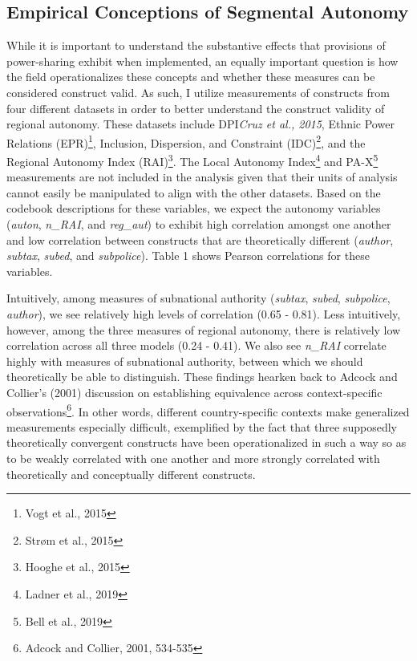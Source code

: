 \documentclass[12pt]{article}
\begin{document}
\subsection{Empirical Conceptions of Segmental Autonomy}
While it is important to understand the substantive effects that provisions of power-sharing exhibit when implemented, an equally important question is how the field operationalizes these concepts and whether these measures can be considered construct valid. As such, I utilize measurements of constructs from four different datasets in order to better understand the construct validity of regional autonomy. These datasets include DPI\textit{Cruz et al., 2015}, Ethnic Power Relations (EPR)\footnote{Vogt et al., 2015}, Inclusion, Dispersion, and Constraint (IDC)\footnote{Strøm et al., 2015}, and the Regional Autonomy Index (RAI)\footnote{Hooghe et al., 2015}. The Local Autonomy Index\footnote{Ladner et al., 2019} and PA-X\footnote{Bell et al., 2019} measurements are not included in the analysis given that their units of analysis cannot easily be manipulated to align with the other datasets. Based on the codebook descriptions for these variables, we expect the autonomy variables (\textit{auton}, \textit{n\_RAI}, and \textit{reg\_aut}) to exhibit high correlation amongst one another and low correlation between constructs that are theoretically different (\textit{author}, \textit{subtax}, \textit{subed}, and \textit{subpolice}). Table 1 shows Pearson correlations for these variables.

Intuitively, among measures of subnational authority (\textit{subtax}, \textit{subed}, \textit{subpolice}, \textit{author}), we see relatively high levels of correlation (0.65 - 0.81). Less intuitively, however, among the three measures of regional autonomy, there is relatively low correlation across all three models (0.24 - 0.41). We also see \textit{n\_RAI} correlate highly with measures of subnational authority, between which we should theoretically be able to distinguish. These findings hearken back to Adcock and Collier's (2001) discussion on establishing equivalence across context-specific observations\footnote{Adcock and Collier, 2001, 534-535}. In other words, different country-specific contexts make generalized measurements especially difficult, exemplified by the fact that three supposedly theoretically convergent constructs have been operationalized in such a way so as to be weakly correlated with one another and more strongly correlated with theoretically and conceptually different constructs.
\end{document}

